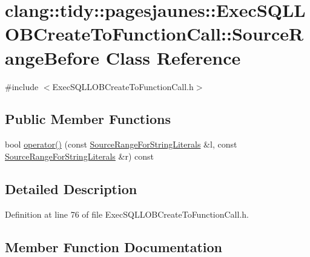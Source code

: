 \hypertarget{classclang_1_1tidy_1_1pagesjaunes_1_1_exec_s_q_l_l_o_b_create_to_function_call_1_1_source_range_before}{}\section{clang\+:\+:tidy\+:\+:pagesjaunes\+:\+:Exec\+S\+Q\+L\+L\+O\+B\+Create\+To\+Function\+Call\+:\+:Source\+Range\+Before Class Reference}
\label{classclang_1_1tidy_1_1pagesjaunes_1_1_exec_s_q_l_l_o_b_create_to_function_call_1_1_source_range_before}


{\ttfamily \#include $<$Exec\+S\+Q\+L\+L\+O\+B\+Create\+To\+Function\+Call.\+h$>$}

\subsection*{Public Member Functions}
\begin{DoxyCompactItemize}
\item 
bool \hyperlink{classclang_1_1tidy_1_1pagesjaunes_1_1_exec_s_q_l_l_o_b_create_to_function_call_1_1_source_range_before_a1a840d0db4079d9cfea894456b621f91}{operator()} (const \hyperlink{classclang_1_1tidy_1_1pagesjaunes_1_1_exec_s_q_l_l_o_b_create_to_function_call_1_1_source_range_for_string_literals}{Source\+Range\+For\+String\+Literals} \&l, const \hyperlink{classclang_1_1tidy_1_1pagesjaunes_1_1_exec_s_q_l_l_o_b_create_to_function_call_1_1_source_range_for_string_literals}{Source\+Range\+For\+String\+Literals} \&r) const
\end{DoxyCompactItemize}


\subsection{Detailed Description}


Definition at line 76 of file Exec\+S\+Q\+L\+L\+O\+B\+Create\+To\+Function\+Call.\+h.



\subsection{Member Function Documentation}
\mbox{\label{classclang_1_1tidy_1_1pagesjaunes_1_1_exec_s_q_l_l_o_b_create_to_function_call_1_1_source_range_before_a1a840d0db4079d9cfea894456b621f91}} 
